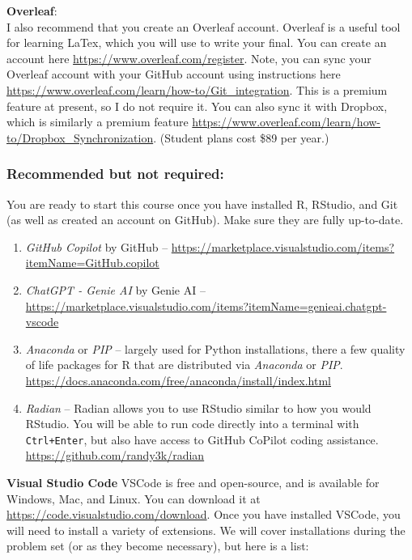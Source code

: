 \documentclass[11pt]{article}
\begin{document}
\hspace{-0.25cm} \textbf{Overleaf}: \\
I also recommend that you create an Overleaf account. Overleaf is a useful tool for learning LaTex, which you will use to write your final. You can create an account here \url{https://www.overleaf.com/register}. Note, you can sync your Overleaf account with your GitHub account using instructions here \url{https://www.overleaf.com/learn/how-to/Git_integration}. This is a premium feature at present, so I do not require it. You can also sync it with Dropbox, which is similarly a premium feature \url{https://www.overleaf.com/learn/how-to/Dropbox_Synchronization}. (Student plans cost \$89 per year.)

\vspace{-0.25cm}
\subsubsection*{Recommended but not required:}

You are ready to start this course once you have installed R, RStudio, and Git (as well as created an account on GitHub). Make sure they are fully up-to-date.

\begin{enumerate}
  \item \textit{GitHub Copilot} by GitHub -- \url{https://marketplace.visualstudio.com/items?itemName=GitHub.copilot}
  \item \textit{ChatGPT - Genie AI} by Genie AI -- \url{https://marketplace.visualstudio.com/items?itemName=genieai.chatgpt-vscode}
  \item \textit{Anaconda} or \textit{PIP} -- largely used for Python installations, there a few quality of life packages for R that are distributed via \textit{Anaconda} or \textit{PIP}. \url{https://docs.anaconda.com/free/anaconda/install/index.html}
  \item \textit{Radian} -- Radian allows you to use RStudio similar to how you would RStudio. You will be able to run code directly into a terminal with \texttt{Ctrl+Enter}, but also have access to GitHub CoPilot coding assistance. \url{https://github.com/randy3k/radian}
\end{enumerate}

\textbf{Visual Studio Code}
VSCode is free and open-source, and is available for Windows, Mac, and Linux. You can download it at \url{https://code.visualstudio.com/download}. Once you have installed VSCode, you will need to install a variety of extensions. We will cover installations during the problem set (or as they become necessary), but here is a list:
\end{document}
